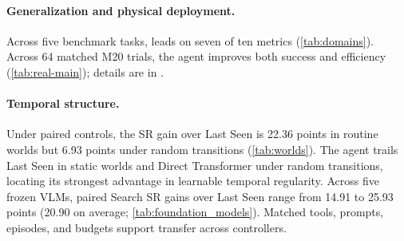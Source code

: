 \begin{table}
\vspace{-0.7\baselineskip}
\caption{Primary LYNX M20 search results.}
\label{tab:real-main}
\centering
\scriptsize
\setlength{\tabcolsep}{2.2pt}
\end{table}

\paragraph{Generalization and physical deployment.}
Across five benchmark tasks, \evolvingworldnav{} leads on seven of ten metrics (\cref{tab:domains}).
Across 64 matched M20 trials, the agent improves both success and
efficiency (\cref{tab:real-main}); details are in .


\paragraph{Temporal structure.}
Under paired controls, the SR gain over Last Seen is 22.36 points in routine
worlds but 6.93 points under random transitions (\cref{tab:worlds}).
The agent trails Last Seen in static worlds and Direct Transformer under random
transitions, locating its strongest advantage in learnable temporal regularity.
Across five frozen VLMs, paired Search SR gains over Last Seen range from 14.91
to 25.93 points (20.90 on average; \cref{tab:foundation_models}). Matched
tools, prompts, episodes, and budgets support transfer across controllers.

